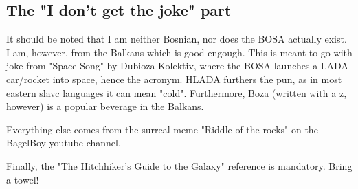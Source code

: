 \documentclass[10pt]{article}
\begin{document}
    \begin{appendices}
        \section{The "I don't get the joke" part}

            It should be noted that I am neither Bosnian, nor does the BOSA
            actually exist. I am, however, from the Balkans which is good engough.
            This is meant to go with joke from "Space Song" by Dubioza Kolektiv,
            where the BOSA launches a LADA car/rocket into space, hence the
            acronym. HLADA furthers the pun, as in most eastern slavc languages it
            can mean "cold". Furthermore, Boza (written with a z, however) is a
            popular beverage in the Balkans.

            Everything else comes from the surreal meme "Riddle of the rocks" on
            the BagelBoy youtube channel.

            Finally, the "The Hitchhiker's Guide to the Galaxy" reference is
            mandatory. Bring a towel!

    \end{appendices}
\end{document}
